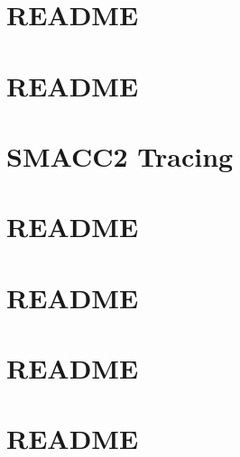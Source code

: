 \documentclass[twoside]{book}
\newcommand{\+}{\discretionary{\mbox{\scriptsize$\hookleftarrow$}}{}{}}
\begin{document}
\chapter{README}
\label{md_smacc2_performance_tools_performance_tests_sm_atomic_subscribers_performance_test_README}

\chapter{README}
\label{md_smacc2_performance_tools_performance_tests_sm_coretest_transition_speed_1_README}

\chapter{SMACC2 Tracing}
\label{md_smacc2_performance_tools_tracing_tools_README}

\chapter{README}
\label{md_smacc2_sm_reference_library__smacc2_sm_template_README}

\chapter{README}
\label{md_smacc2_sm_reference_library_sm_advanced_recovery_1_README}

\chapter{README}
\label{md_smacc2_sm_reference_library_sm_atomic_README}

\chapter{README}
\label{md_smacc2_sm_reference_library_sm_atomic_24hr_README}

\end{document}
